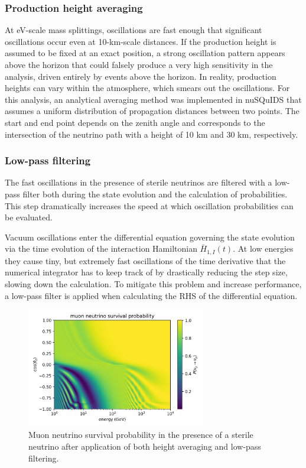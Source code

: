 \subsubsection{Production height averaging}
At eV-scale mass splittings, oscillations are fast enough that significant oscillations occur even at 10-km-scale distances. If the production height is assumed to be fixed at an exact position, a strong oscillation pattern appears above the horizon that could falsely produce a very high sensitivity in the analysis, driven entirely by events above the horizon. In reality, production heights can vary within the atmosphere, which smears out the oscillations. For this analysis, an analytical averaging method was implemented in nuSQuIDS that assumes a uniform distribution of propagation distances between two points. The start and end point depends on the zenith angle and corresponds to the intersection of the neutrino path with a height of 10 km and 30 km, respectively.

\subsubsection{Low-pass filtering}
\label{sec:low-pass-filtering}
The fast oscillations in the presence of sterile neutrinos are filtered with a low-pass filter both during the state evolution and the calculation of probabilities. This step dramatically increases the speed at which oscillation probabilities can be evaluated.

Vacuum oscillations enter the differential equation governing the state evolution via the time evolution of the interaction Hamiltonian $\bar{H}_{1, I}(t)$. At low energies they cause tiny, but extremely fast oscillations of the time derivative that the numerical integrator has to keep track of by drastically reducing the step size, slowing down the calculation. To mitigate this problem and increase performance, a low-pass filter is applied when calculating the RHS of the differential equation.

\begin{figure}
    \centering
    \includegraphics[width=0.7\textwidth]{figures/measurement/sterile_analysis/nusquids/Dm41_0.5eV2_th24_15deg_avg_height_10-30km_lp_belowhor.png}
    \caption{Muon neutrino survival probability in the presence of a sterile neutrino after application of both height averaging and low-pass filtering.}
    \label{fig:nusquids-low-pass-filtering}
\end{figure}

